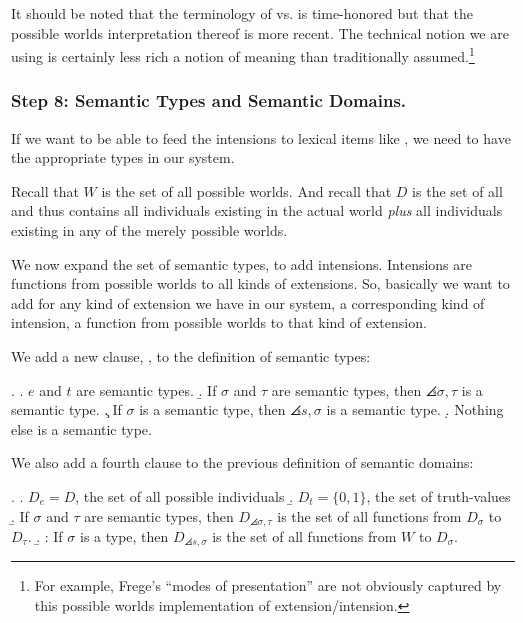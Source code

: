 It %
%
should be noted that the terminology of  vs.
 is time-honored but that the possible worlds
interpretation thereof is more recent. The technical notion we are
using is certainly less rich a notion of meaning than traditionally
assumed.\footnote{For example, Frege's ``modes of presentation'' are
  not obviously captured by this possible worlds implementation of
  extension/intension.}

\subsubsection{Step 8: Semantic Types and Semantic Domains.} \label{sec:semantic-types}

If we want to be able to feed the intensions to lexical items like
, we need to have the
appropriate types in our system.

Recall that $W$ is the set of all possible worlds. And recall that $D$
is the set of all  and thus contains all
individuals existing in the actual world \emph{plus} all individuals
existing in any of the merely possible worlds.

We now expand the set of semantic types, to add intensions. Intensions
are functions from possible worlds to all kinds of extensions. So,
basically we want to add for any kind of extension we have in our
system, a corresponding kind of intension, a function from possible
worlds to that kind of extension.

We add a new clause, \Next[c], to the definition of semantic types:

\ex. 
\a. $e$ and $t$ are semantic types.
\b. If $\sigma$ and $\tau$ are semantic types, then $\angles{\sigma,\tau}$ is a semantic type.
\c. If $\sigma$ is a semantic type, then $\angles{s,\sigma}$ is a semantic type.
\d. Nothing else is a semantic type.

We also add a fourth clause to the previous definition of semantic
domains:

\ex.  \a. $D_{e} = D$, the set of all possible individuals \b. $D_{t} = \{0,1\}$, the set of truth-values \b. If $\sigma$ and $\tau$ are semantic types, then $D_{\angles{\sigma,\tau}}$ is the set of all functions from $D_{\sigma}$ to $D_{\tau}$. \b. : If $\sigma$ is a type, then $D_{\angles{s,\sigma}}$ is the set of all functions from $W$ to $D_{\sigma}$.

